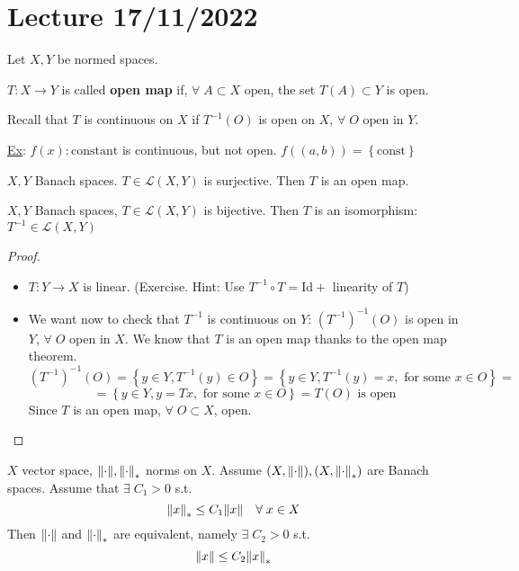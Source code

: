\section{Lecture 17/11/2022}
Let \(X, Y\) be normed spaces.
\begin{definition}
    \(T: X \to Y\) is called \textbf{open map} if, \(\forall \; A \subset X \mbox{ open}\), the set \(T(A)\subset Y\) is open.
\end{definition}
\begin{remark}
    Recall that \(T\) is continuous on \(X\) if \(T^{-1}(O)\) is open on \(X\), \(\forall \; O \mbox{ open in } Y\).
\end{remark}
\noindent\underline{Ex}: \(f(x) : \mbox{constant}\) is continuous, but not open. \(f((a,b)) = \left\{ \mbox{const} \right\}\)
\begin{theorem}
    \(X, Y\) Banach spaces. \(T \in \mathcal{L}(X,Y)\) is surjective. Then \(T\) is an open map.
\end{theorem}
\begin{corollary}
    \(X,Y\) Banach spaces, \(T \in \mathcal{L}(X,Y)\) is bijective. Then \(T\) is an isomorphism: \(T^{-1} \in \mathcal{L}(X,Y)\)
\end{corollary}
\begin{proof}
    \begin{itemize}
        \item \(T : Y \to X\) is linear. (Exercise. Hint: Use \(T^{-1} \circ T = \text{Id} + \) linearity of \(T\))
        \item We want now to check that \(T^{-1}\) is continuous on \(Y\): \((T^{-1})^{-1}(O)\) is open in \(Y\), \(\forall \; O\) open in \(X\). We know that \(T\) is an open map thanks to the open map theorem.
        \[
            (T^{-1})^{-1}(O) = \left\{ y \in Y, T^{-1}(y) \in O \right\} = \left\{ y \in Y, T^{-1}(y) = x, \mbox{ for some } x \in O \right\} =
        \]
        \[
            = \left\{ y \in Y, y = Tx, \mbox{ for some } x \in O\right\} = T(O) \mbox{ is open}
        \]
    Since \(T\) is an open map, \(\forall \; O \subset X\), open.
    \end{itemize}
\end{proof}
\begin{corollary}
    \(X\) vector space, \(\norm{\cdot}, \norm{\cdot}_*\) norms on \(X\). Assume \((X, \norm{\cdot}), (X, \norm{\cdot}_*)\) are Banach spaces. 
    Assume that \(\exists \; C_1 > 0\) s.t. 
    \[
        \norm{x}_* \leq C_1\norm{x} \quad \forall \; x \in X
    \]
    Then \(\norm{\cdot}\) and \(\norm{\cdot}_*\) are equivalent, namely \(\exists \; C_2 > 0\) s.t. 
    \[
        \norm{x} \leq C_2 \norm{x}_*
    \]
\end{corollary}
